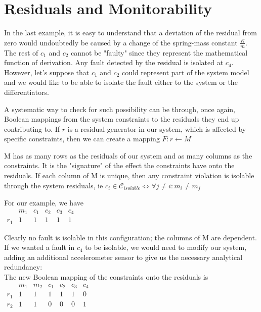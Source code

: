 \section{Residuals and Monitorability}

In the last example, it is easy to understand that a deviation of the residual from zero would undoubtedly be caused by a change of the spring-mass constant $\frac{K}{m}$. The rest of $c_1$ and $c_2$ cannot be "faulty" since they represent the mathematical function of derivation. Any fault detected by the residual is isolated at $c_4$. However, let's suppose that $c_1$ and $c_2$ could represent part of the system model and we would like to be able to isolate the fault either to the system or the differentiators.

A systematic way to check for such possibility can be through, once again, Boolean mappings from the system constraints to the residuals they end up contributing to. If $r$ is a residual generator in our system, which is affected by specific constraints, then we can create a mapping 
$F : r \leftarrow M$

M has as many rows as the residuals of our system and as many columns as the constraints. It is the "signature" of the effect the constraints have onto the residuals. If each column of M is unique, then any constraint violation is isolable through the system residuals, ie 
$c_i \in \mathcal{C}_{isolable} \Leftrightarrow \forall j \neq i: m_i \neq m_j$


For our example, we have\\
$\begin{array}{c|ccclcl}
	\>  & m_1 & c_1 & c_2 & c_3 & c_4 &  \\ \hline
	r_1 &  1  &  1  &  1  & 1   &  1  &
\end{array}$

Clearly no fault is isolable in this configuration; the columns of M are dependent. If we wanted a fault in $c_4$ to be isolable, we would need to modify our system, adding an additional accelerometer sensor to give us the necessary analytical redundancy:\\


The new Boolean mapping of the constraints onto the residuals is\\
$\begin{array}{c|cccccc}
	\>  & m_1 & m_2 & c_1 & c_2 & c_3 & c_4 \\ \hline
	r_1 &  1  &  1  &  1  &  1  &  1  &  0  \\
	r_2 &  1  &  1  &  0  &  0  &  0  &  1
\end{array}$

